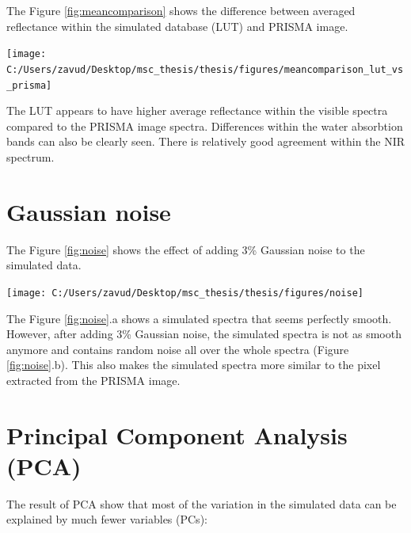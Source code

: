 \documentclass[a4paper, twoside]{templates/ociamthesis}
\let\origfigure\figure
\let\endorigfigure\endfigure
\renewenvironment{figure}[1][2] {
    \expandafter\origfigure\expandafter[H]
} {
    \endorigfigure
}
\begin{document}
The Figure \ref{fig:meancomparison} shows the difference between averaged reflectance within the simulated database (LUT) and PRISMA image.

\begin{figure}

{\centering \texttt{[image: C:/Users/zavud/Desktop/msc\_thesis/thesis/figures/meancomparison\_lut\_vs\_prisma]} 

}

\caption{Difference between averaged LUT and PRISMA image reflectance}\label{fig:meancomparison}
\end{figure}

The LUT appears to have higher average reflectance within the visible spectra compared to the PRISMA image spectra. Differences within the water absorbtion bands can also be clearly seen. There is relatively good agreement within the NIR spectrum.

\newpage

\hypertarget{gaussian-noise-1}{%
\section{Gaussian noise}\label{gaussian-noise-1}}

The Figure \ref{fig:noise} shows the effect of adding 3\% Gaussian noise to the simulated data.

\begin{figure}
\texttt{[image: C:/Users/zavud/Desktop/msc\_thesis/thesis/figures/noise]} \caption{Effect of adding $3\%$ Gaussian noise to the simulated spectra. The randomly chosen pixel from the PRISMA data was plotted to illustrate the noise found typically in the image}\label{fig:noise}
\end{figure}

The Figure \ref{fig:noise}.a shows a simulated spectra that seems perfectly smooth. However, after adding 3\% Gaussian noise, the simulated spectra is not as smooth anymore and contains random noise all over the whole spectra (Figure \ref{fig:noise}.b). This also makes the simulated spectra more similar to the pixel extracted from the PRISMA image.

\hypertarget{principal-component-analysis-pca-1}{%
\section{Principal Component Analysis (PCA)}\label{principal-component-analysis-pca-1}}

The result of PCA show that most of the variation in the simulated data can be explained by much fewer variables (PCs):
\end{document}
